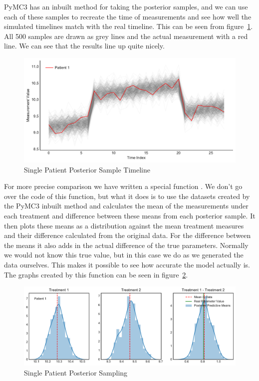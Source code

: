 \documentclass[12pt,a4paper,leqno]{report}
\theoremstyle{plain}
\theoremstyle{definition}
\theoremstyle{remark}
\begin{document}
PyMC3 has an inbuilt method for taking the posterior samples, and we can use each of
these samples to recreate the time of measurements and see how well the simulated
timelines match with the real timeline. This can be seen from figure\ \ref{singlepatientposteriortimeline}.
All 500 samples are drawn as grey lines and the actual measurement with a red line.
We can see that the results line up quite nicely.

\bigskip
\begin{figure}[H]
    \caption{Single Patient Posterior Sample Timeline}\label{singlepatientposteriortimeline}
    \bigskip
    \includegraphics[width=\textwidth,height=\textheight,keepaspectratio]{posterior_sample_timeline_single_patient.pdf}
\end{figure}
\bigskip

For more precise comparison we have written a special function
. We don't go over the code of this function,
but what it does is to use the datasets created by the PyMC3 inbuilt method and
calculates the mean of the measurements under each treatment and difference between
these means from each posterior sample. It then plots these means as a distribution against the mean treatment
measures and their difference calculated from the
original data. For the difference between the means it also adds in the actual
difference of the true parameters. Normally we would not know
this true value, but in this case we do as we generated the data ourselves. This
makes it possible to see how accurate the model actually is. The graphs created by this
function can be seen in figure\ \ref{singlepatientposteriorsampling}.

\bigskip
\begin{figure}[H]
    \caption{Single Patient Posterior Sampling}\label{singlepatientposteriorsampling}
    \bigskip
    \includegraphics[width=\textwidth,height=\textheight,keepaspectratio]{single_patient_posterior_sampling.pdf}
\end{figure}
\bigskip
\end{document}
